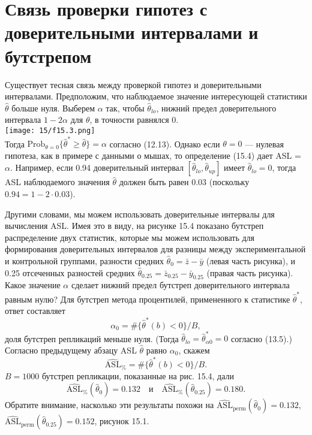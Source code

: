 \section{Связь проверки гипотез с доверительными интервалами и бутстрепом}

Существует тесная связь между проверкой гипотез и доверительными интервалами. Предположим, что наблюдаемое значение интересующей статистики $\hat{\theta}$ больше нуля. Выберем $\alpha$ так, чтобы $\hat{\theta}_{lo}$, нижний предел доверительного интервала $1-2\alpha$ для $\theta$, в точности равнялся 0.\\
\noindent
\texttt{[image: 15/f15.3.png]}
\newline\\
\noindent Тогда $\text{Prob}_{\theta=0}\{ \hat{\theta}^* \geq \hat{\theta} \} = \alpha$ согласно (12.13). Однако если $\theta = 0$ --- нулевая гипотеза, как в примере с данными о мышах, то определение (15.4) дает ASL = $\alpha$. Например, если 0.94 доверительный интервал $[\hat{\theta}_{lo}, \hat{\theta}_{up}]$ имеет $\hat{\theta}_{lo} = 0$, тогда ASL наблюдаемого значения $\hat{\theta}$ должен быть равен 0.03 (поскольку $0.94 = 1 - 2 \cdot 0.03$).

Другими словами, мы можем использовать доверительные интервалы для вычисления ASL. Имея это в виду, на рисунке 15.4 показано бутстреп распределение двух статистик, которые мы можем использовать для формирования доверительных интервалов для разницы между экспериментальной и контрольной группами, разности средних $\hat{\theta}_0 = \bar{z} - \bar{y}$ (левая часть рисунка), и 0.25 отсеченных разностей средних $\hat{\theta}_{0.25} = \bar{z}_{0.25} - \bar{y}_{0.25}$ (правая часть рисунка). Какое значение $\alpha$ сделает нижний предел бутстреп доверительного интервала равным нулю? Для бутстреп метода процентилей, примененного к статистике $\hat{\theta}^*$, ответ составляет
\begin{equation}
	\alpha_0 = \# \{ \hat{\theta}^*(b) < 0 \}/B,
\end{equation}
доля бутстреп репликаций меньше нуля. (Тогда $\hat{\theta}_{lo} = \hat{\theta}^*_{\alpha 0} = 0$ согласно (13.5).) Согласно предыдущему абзацу ASL $\hat{\theta}$ равно $\alpha_0$, скажем
\begin{equation}
	\widehat{\text{ASL}}_{\%} = \#\{\hat{\theta}^*(b)<0\}/B.
\end{equation}
$B = 1000$ бутстреп репликации, показанные на рис. 15.4, дали
\begin{equation}
	\widehat{\text{ASL}}_{\%}(\hat{\theta}_0) = 0.132 \quad \text{и} \quad \widehat{\text{ASL}}_{\%}(\hat{\theta}_{0.25}) = 0.180.
\end{equation}
Обратите внимание, насколько эти результаты похожи на $\widehat{\text{ASL}}_{\text{perm}} (\hat{\theta}_{0}) = 0.132$, $\widehat{\text{ASL}}_{\text{perm}} (\hat{\theta}_{0.25}) = 0.152$, рисунок 15.1.

